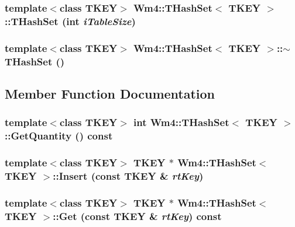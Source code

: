 \subsubsection{\setlength{\rightskip}{0pt plus 5cm}template$<$class TKEY$>$ {\bf Wm4::THash\-Set}$<$ TKEY $>$::{\bf THash\-Set} (int {\em i\-Table\-Size})}\label{classWm4_1_1THashSet_cf62dc58fa248979183ac178e651c34f}


\subsubsection{\setlength{\rightskip}{0pt plus 5cm}template$<$class TKEY$>$ {\bf Wm4::THash\-Set}$<$ TKEY $>$::$\sim${\bf THash\-Set} ()}\label{classWm4_1_1THashSet_546fa20d516e1f45ebe61212a200b5f6}




\subsection{Member Function Documentation}
\subsubsection{\setlength{\rightskip}{0pt plus 5cm}template$<$class TKEY$>$ int {\bf Wm4::THash\-Set}$<$ TKEY $>$::Get\-Quantity () const}\label{classWm4_1_1THashSet_1c82e81469efa595b3a2885a93def346}


\subsubsection{\setlength{\rightskip}{0pt plus 5cm}template$<$class TKEY$>$ TKEY $\ast$ {\bf Wm4::THash\-Set}$<$ TKEY $>$::Insert (const TKEY \& {\em rt\-Key})}\label{classWm4_1_1THashSet_ab2aff76b120f5d69569d500a345d769}


\subsubsection{\setlength{\rightskip}{0pt plus 5cm}template$<$class TKEY$>$ TKEY $\ast$ {\bf Wm4::THash\-Set}$<$ TKEY $>$::Get (const TKEY \& {\em rt\-Key}) const}\label{classWm4_1_1THashSet_ab76381c59acfa352ddea717a06ae0a8}


